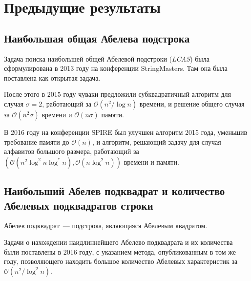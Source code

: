 \section{Предыдущие результаты}
\subsection{Наибольшая общая Абелева подстрока}
Задача поиска наибольшей общей Абелевой подстроки (\textit{LCAS}) была сформулирована в 2013 году на конференции StringMasters. Там она была поставлена как открытая задача.

После этого в 2015 году чуваки предложили субквадратичный алгоритм для случая $\sigma=2$, работающий за $\mathcal{O}(n^2/\log n)$ времени, и решение общего случая за $\mathcal{O}(n^2\sigma)$ времени и $\mathcal{O}(n\sigma)$ памяти.

В 2016 году на конференции SPIRE был улучшен алгоритм 2015 года, уменьшив требование памяти до $\mathcal{O}(n)$, и алгоритм, решающий задачу для случая алфавитов большого размера, работающий за $(\mathcal{O}(n^2 \log^2 n \log^* n), \mathcal{O}(n \log^2 n))$ времени и памяти.

\subsection{Наибольший Абелев подквадрат и количество Абелевых подквадратов строки}
Абелев подквадрат~--- подстрока, являющаяся Абелевым квадратом.

Задачи о нахождении наидлиннейшего Абелево подквадрата и их количества были поставлены в 2016 году, с указанием метода, опубликованным в том же году, позволяющего находить большое количество Абелевых характеристик за $\mathcal{O}(n^2 / \log^2 n)$.